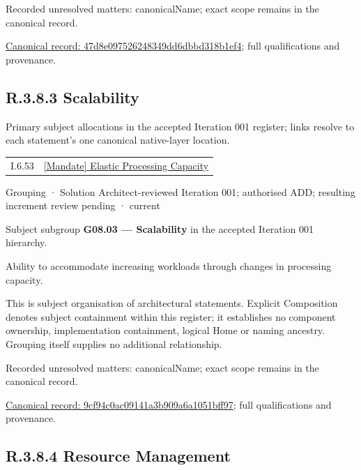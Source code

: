 {\small Recorded unresolved matters: canonicalName; exact scope remains in the canonical record.}\par
{\footnotesize \href{../../../../continuum/grouping/47d8e097526248349dd6dbbd318b1ef4.md}{Canonical record: 47d8e097526248349dd6dbbd318b1ef4}; full qualifications and provenance.}\par
\subsection*{R.3.8.3 Scalability}
\label{navigation:R.3.8.3}

Primary subject allocations in the accepted Iteration 001 register; links resolve to each statement’s one canonical native-layer location.\par
\begin{longtable}{p{.22\linewidth}p{.73\linewidth}}
I.6.53 & \hyperref[element:ea33d8db942f4b5b9e322d74cbfe975b]{[Mandate] Elastic Processing Capacity} \\
\end{longtable}
\label{element:9cf94c0ac09141a3b909a6a1051bff97}
{\small Grouping · Solution Architect-reviewed Iteration 001; authorised ADD; resulting increment review pending · current}\par

Subject subgroup \textbf{G08.03 — Scalability} in the accepted Iteration 001 hierarchy.



Ability to accommodate increasing workloads through changes in processing capacity.



This is subject organisation of architectural statements. Explicit Composition denotes subject containment within this register; it establishes no component ownership, implementation containment, logical Home or naming ancestry. Grouping itself supplies no additional relationship.


{\small Recorded unresolved matters: canonicalName; exact scope remains in the canonical record.}\par
{\footnotesize \href{../../../../continuum/grouping/9cf94c0ac09141a3b909a6a1051bff97.md}{Canonical record: 9cf94c0ac09141a3b909a6a1051bff97}; full qualifications and provenance.}\par
\subsection*{R.3.8.4 Resource Management}
\label{navigation:R.3.8.4}

